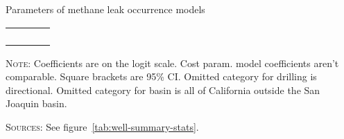\begin{threeparttable}

\caption{Parameters of methane leak occurrence models}

\label{tab:param-leak-obs}
\begin{tabularx}{0.8\textwidth}{l d d d}
\toprule
&  &  &  \\
&  &  &  \\
\midrule
\\
\midrule
\\
\bottomrule
\end{tabularx}
\begin{tablenotes}
\item \textsc{Note:}
Coefficients are on the logit scale.
Cost param. model coefficients aren't comparable.
Square brackets are 95\% CI.
Omitted category for drilling is directional.
Omitted category for basin is all of California outside the San Joaquin basin.

\textsc{Sources:} See figure~\ref{tab:well-summary-stats}.
\end{tablenotes}
\end{threeparttable}
